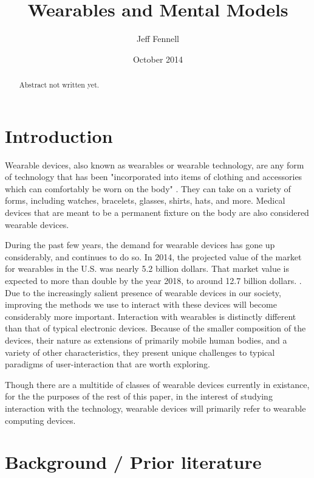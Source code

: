 \documentclass[12pt]{article}
\begin{document}
\begin{abstract}
Abstract not written yet.

\end{abstract}

\title{Wearables and Mental Models}
\author{Jeff Fennell}
\date{October 2014}
\maketitle

\tableofcontents

\section{Introduction}
Wearable devices, also known as wearables or wearable technology, are any form of technology that has been "incorporated into items of clothing and accessories which can comfortably be worn on the body" \cite{wd}. They can take on a variety of forms, including watches, bracelets, glasses, shirts, hats, and more. Medical devices that are meant to be a permanent fixture on the body are also considered wearable devices.

During the past few years, the demand for wearable devices has gone up considerably, and continues to do so. In 2014, the projected value of the market for wearables in the U.S. was nearly 5.2 billion dollars. That market value is expected to more than double by the year 2018, to around 12.7 billion dollars. \cite{wmv}. Due to the increasingly salient presence of wearable devices in our society, improving the methods we use to interact with these devices will become considerably more important. Interaction with wearables is distinctly different than that of typical electronic devices.  Because of the smaller composition of the devices, their nature as extensions of primarily mobile human bodies, and a variety of other characteristics, they present unique challenges to typical paradigms of user-interaction that are worth exploring.

Though there are a multitide of classes of wearable devices currently in existance, for the the purposes of the rest of this paper, in the interest of studying interaction with the technology, wearable devices will primarily refer to wearable computing devices.

\section{Background / Prior literature}
\end{document}
